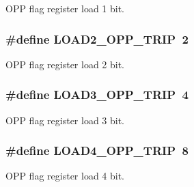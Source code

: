 O\-P\-P flag register load 1 bit. \hypertarget{a00032_a2f2ad16c48f8bfdb51272ac7c001b005}{
\subsubsection[{L\-O\-A\-D2\-\_\-\-O\-P\-P\-\_\-\-T\-R\-I\-P}]{\setlength{\rightskip}{0pt plus 5cm}\#define L\-O\-A\-D2\-\_\-\-O\-P\-P\-\_\-\-T\-R\-I\-P~2}}\label{a00032_a2f2ad16c48f8bfdb51272ac7c001b005}
O\-P\-P flag register load 2 bit. \hypertarget{a00032_afb895ec8b4e74e28a73708371b75cdb7}{
\subsubsection[{L\-O\-A\-D3\-\_\-\-O\-P\-P\-\_\-\-T\-R\-I\-P}]{\setlength{\rightskip}{0pt plus 5cm}\#define L\-O\-A\-D3\-\_\-\-O\-P\-P\-\_\-\-T\-R\-I\-P~4}}\label{a00032_afb895ec8b4e74e28a73708371b75cdb7}
O\-P\-P flag register load 3 bit. \hypertarget{a00032_afb8941d83fb2ddbdf96fdf7ac8f5d259}{
\subsubsection[{L\-O\-A\-D4\-\_\-\-O\-P\-P\-\_\-\-T\-R\-I\-P}]{\setlength{\rightskip}{0pt plus 5cm}\#define L\-O\-A\-D4\-\_\-\-O\-P\-P\-\_\-\-T\-R\-I\-P~8}}\label{a00032_afb8941d83fb2ddbdf96fdf7ac8f5d259}
O\-P\-P flag register load 4 bit. 

